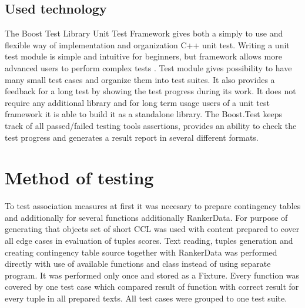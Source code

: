 \subsection{Used technology}\label{test_boost}
The Boost Test Library Unit Test Framework gives both a simply to use and flexible way of implementation and organization C++ unit test. 
Writing a unit test module is simple and intuitive for beginners, but framework allows more advanced users to perform complex tests \cite{boost}. 
Test module gives possibility to have many small test cases and organize them into test suites. It also provides a feedback for a long test by 
showing the test progress during its work. It does not require any additional library and for long term usage users of a unit test framework 
it is able to build it as a standalone library. The Boost.Test keeps track of all passed/failed testing tools assertions, 
provides an ability to check the test progress and generates a result report in several different formats.

\section{Method of testing}
To test association measures at first it was necesary to prepare contingency tables and additionally for several functions additionally RankerData. 
For purpose of generating that objects set of short CCL was used with content prepared to cover all edge cases in evaluation of tuples scores. 
Text reading, tuples generation and creating contingency table source together with RankerData was performed directly with use of available functions 
and class instead of using separate program. It was performed only once and stored as a Fixture. Every function was covered by one test case which 
compared result of function with correct result for every tuple in all prepared texts. All test cases were grouped to one test suite.

